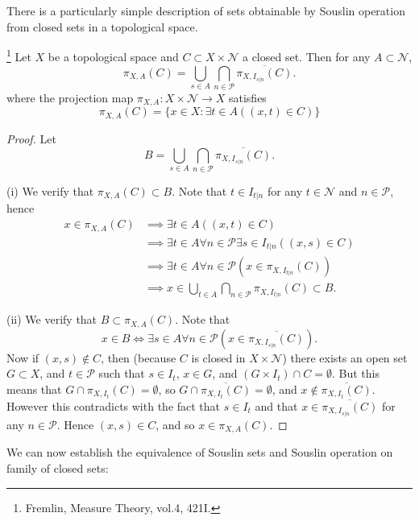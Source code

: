 There is a particularly simple description of sets obtainable by Souslin
operation from closed sets in a topological space.
\begin{lemma} \label{L:souslin_close}
\footnote{Fremlin, Measure Theory, vol.4, 421I.}
Let $X$ be a topological space and $C\subset X\times\mathcal{N}$ a closed set.
Then for any $A\subset\mathcal{N}$,
\[
  \pi_{X,A}(C) = \bigcup_{s\in A} \bigcap_{n\in\mathcal{P}}
             \overline{ \pi_{X,I_{s|n}}(C) }.
\]
where the projection map $\pi_{X,A}:X\times \mathcal{N}\to X$ satisfies
\[
  \pi_{X,A}(C) = \{ x\in X: \exists t\in A ((x,t)\in C)  \}
\]
\end{lemma}
\begin{proof}
Let 
\[
  B = \bigcup_{s\in A} \bigcap_{n\in\mathcal{P}} \overline{ \pi_{X,I_{s|n}}(C) }.
\]

(i) We verify that $\pi_{X,A}(C)\subset B$. Note that $t\in I_{t|n}$ for any
$t\in\mathcal{N}$ and $n\in\mathcal{P}$, hence
\begin{align*}
  x\in\pi_{X,A}(C)
    & \implies \exists t\in A ((x,t)\in C)  \\
    & \implies \exists t\in A \forall n\in\mathcal{P} \exists s\in I_{t|n} ((x,s)\in C)  \\
    & \implies \exists t\in A \forall n\in\mathcal{P} (x\in \pi_{X,I_{t|n}}(C))  \\
    & \implies x\in \bigcup_{t\in A} \bigcap_{n\in\mathcal{P}} \pi_{X,I_{t|n}}(C)
	  \subset B.
\end{align*}

(ii) We verify that $B\subset\pi_{X,A}(C)$. Note that
\[
  x\in B \iff \exists s\in A \forall n\in\mathcal{P} ( x\in \overline{\pi_{X,I_{s|n}}(C)} ).
\]
Now if $(x,s)\notin C$, then (because $C$ is closed in $X\times \mathcal{N}$)
there exists an open set $G\subset X$, and $t\in \mathcal{P}$ such that 
$s\in I_t$, $x\in G$, and $(G\times I_t)\cap C=\emptyset$.
But this means that $G\cap \pi_{X,I_t}(C)=\emptyset$, 
so $G\cap \overline{\pi_{X,I_t}(C)} =\emptyset$, and $x\notin \overline{\pi_{X,I_t}(C)}$.
However this contradicts with the fact that $s\in I_t$ and that 
$x\in \overline{\pi_{X,I_{s|n}}(C)}$ for any $n\in\mathcal{P}$.
Hence $(x,s)\in C$, and so $x\in \pi_{X,A}(C)$.
\end{proof}

We can now establish the equivalence of Souslin sets and Souslin operation on
family of closed sets:

